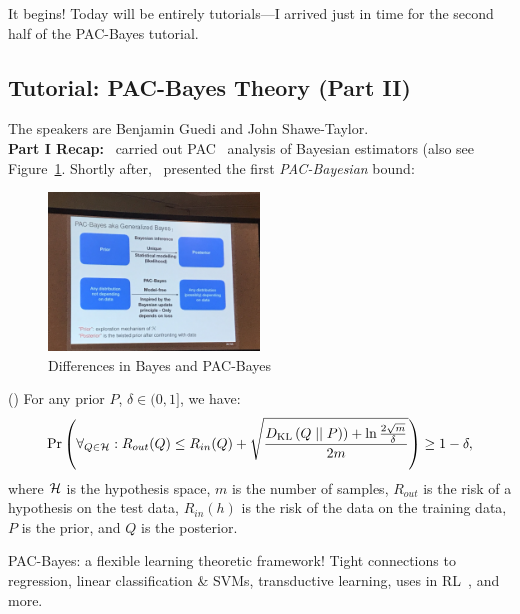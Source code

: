  It begins! Today will be entirely tutorials---I arrived just in time for the second half of the PAC-Bayes tutorial. 

\subsection{Tutorial: PAC-Bayes Theory (Part II)}

The speakers are Benjamin Guedi and John Shawe-Taylor. \\

{\bf Part I Recap:}~\citet{shawe1997pac} carried out PAC~\cite{valiant1984theory} analysis of Bayesian estimators (also see Figure~\ref{fig:pac_bayes}. Shortly after,~\citet{mcallester1999some} presented the first {\it PAC-Bayesian} bound:

\begin{figure}
    \centering
    \includegraphics[width=0.5\textwidth]{images/pb1.JPG}
    \caption{Differences in Bayes and PAC-Bayes}
    \label{fig:pac_bayes}
\end{figure}


\begin{theorem}
\label{thm:pac_bayes}
(\citet{mcallester1999some}) For any prior $P$, $\delta \in (0,1]$, we have:
\begin{equation}
    \Pr\left(\forall_{Q \in \mathcal{H}} : R_{out}(Q) \leq R_{in}(Q) + \sqrt{\frac{D_{\text{KL}}\left(Q \mid \mid P\right)) + \ln \frac{2 \sqrt{m}}{\delta}}{2m}}\right) \geq 1-\delta,
    \label{eq:pac_bayes}
\end{equation}
where $\mathcal{H}$ is the hypothesis space, $m$ is the number of samples, $R_{out}$ is the risk of a hypothesis on the test data, $R_{in}(h)$ is the risk of the data on the training data, $P$ is the prior, and $Q$ is the posterior.
\end{theorem}

PAC-Bayes: a flexible learning theoretic framework! Tight connections to regression, linear classification \& SVMs, transductive learning, uses in RL~\cite{fard2010pac}, and more.


